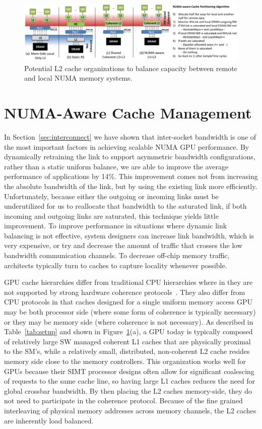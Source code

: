 \begin{figure}[t]
    \centering
    \includegraphics[width=1.0\textwidth]{figures/cache_configurations_static_dynamic.pdf}
    \caption{Potential L2 cache organizations to balance capacity between remote and
    local NUMA memory systems.}
    \label{fig:cacheorg}
\end{figure}

\section{NUMA-Aware Cache Management}
\label{sec:caches}
In Section~\ref{sec:interconnect} we have shown that inter-socket bandwidth is one
of the most important factors in achieving scalable NUMA GPU performance. By
dynamically retraining the link to support asymmetric bandwidth configurations,
rather than a static uniform balance, we are able to improve the average performance
of applications by 14\%.  This improvement comes not from increasing the
absolute bandwidth of the link, but by using the existing link more efficiently.
Unfortunately, because either the outgoing or incoming links must be underutilized
for us to reallocate that bandwidth to the saturated link, if both incoming and
outgoing links are saturated, this technique yields little improvement.
To improve performance in situations where dynamic link balancing is not effective,
system designers can increase link bandwidth, which is very expensive,
or try and decrease the amount of traffic that crosses the low bandwidth
communication channels.  To decrease off-chip memory traffic, architects typically
turn to caches to capture locality whenever possible.

GPU cache hierarchies differ from traditional CPU hierarchies where in they 
are not supported by strong hardware coherence protocols~\cite{Singh2013}. 
They also differ from CPU protocols in that caches designed for a single 
uniform memory access GPU may be both processor side (where some form of 
coherence is typically necessary) or they may be memory side (where coherence 
is not necessary).  As described in Table~\ref{tab:setup} and shown in 
Figure~\ref{fig:cacheorg}(a), a GPU today is typically composed of relatively 
large SW managed coherent L1 caches that are physically proximal to the SM's, 
while a relatively small, distributed, non-coherent L2 cache resides memory 
side close to the memory controllers.  This organization works well for GPUs 
because their SIMT processor designs often allow for significant coalescing 
of requests to the same cache line, so having large L1 caches reduces the 
need for global crossbar bandwidth.  By then placing the L2 caches 
memory-side, they do not need to participate in the coherence protocol.  
Because of the fine grained interleaving of physical memory addresses across 
memory channels, the L2 caches are inherently load balanced.

